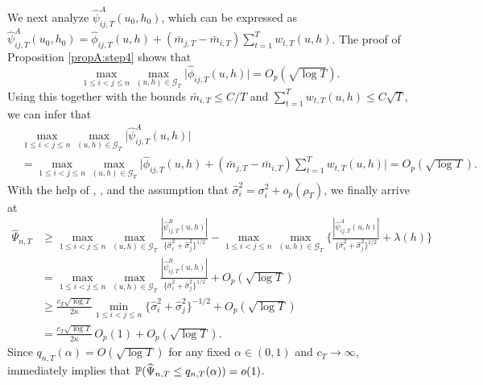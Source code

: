 \documentclass[12pt]{article}
\makeatletter
\renewcommand{\eqref}[1]{\tagform@{\ref{#1}}}
\makeatother
\begin{document}
We next analyze $\widehat{\psi}^A_{ij,T}(u_0,h_0)$, which can be expressed as $\widehat{\psi}^A_{ij,T}(u_0,h_0) = \widehat\phi_{ij,T}(u, h) + (\bar{m}_{j, T} - \bar{m}_{i, T}) \sum_{t=1}^T w_{t, T}(u, h)$. The proof of Proposition \ref{propA:step4} shows that 
\begin{equation*}
\max_{1 \le i < j \le n} \max_{(u,h) \in \mathcal{G}_T} \Big| \widehat{\phi}_{ij, T}(u,h) \Big| = O_p(\sqrt{\log T}). 
\end{equation*}
Using this together with the bounds $\bar{m}_{i, T} \le C/T$ and $\sum_{t=1}^T w_{t, T}(u, h) \le C \sqrt{T}$, we can infer that 
\begin{align} 
 & \max_{1 \le i < j \le n} \max_{(u,h) \in \mathcal{G}_T} \Big| \widehat\psi_{ij,T}^A(u, h) \Big| \nonumber \\[-0.2cm]
 & = \max_{1 \le i < j \le n} \max_{(u,h) \in \mathcal{G}_T} \Big| \widehat\phi_{ij,T}(u, h) + (\bar{m}_{j, T} - \bar{m}_{i, T}) \sum_{t=1}^T w_{t, T}(u, h) \Big| = O_p(\sqrt{\log T}). \label{eqA:power:psiA}
\end{align}
With the help of \eqref{eqA:power:psiB}, \eqref{eqA:power:psiA}, \eqref{eqA:power:lambda} and the assumption that $\widehat{\sigma}^2_i = \sigma^2_i + o_p(\rho_T)$, we finally arrive at 
\begin{align}
\widehat{\Psi}_{n, T}  
 & \ge \max_{1 \le i < j \le n} \max_{(u,h) \in \mathcal{G}_T} \frac{|\widehat{\psi}_{ij, T}^B(u,h)|}{\{\widehat{\sigma}_i^2 + \widehat{\sigma}_j^2\}^{1/2}} - \max_{1 \le i < j \le n} \max_{(u,h) \in \mathcal{G}_T} \bigg\{ \frac{|\widehat{\psi}_{ij, T}^A(u,h)|}{\{\widehat{\sigma}^2_i + \widehat{\sigma}_j^2\}^{1/2}} + \lambda(h) \bigg\} \nonumber \\
 & = \max_{1 \le i < j \le n} \max_{(u,h) \in \mathcal{G}_T} \frac{|\widehat{\psi}_{ij, T}^B(u,h)|}{\{\widehat{\sigma}_i^2 + \widehat{\sigma}_j^2\}^{1/2}} + O_p(\sqrt{\log T}) \nonumber \\
 & \ge \frac{c_T \sqrt{\log T}}{2 \kappa} \min_{1 \le i < j \le n}\{\widehat{\sigma}_i^2 + \widehat{\sigma}_j^2\}^{-1/2} + O_p(\sqrt{\log T}) \nonumber \\
 & = \frac{c_T \sqrt{\log T}}{2 \kappa} \, O_p(1) + O_p(\sqrt{\log T}). \label{eq5-proof-prop-test-power}
\end{align}
Since $q_{n, T}(\alpha) = O(\sqrt{\log T})$ for any fixed $\alpha \in (0,1)$ and $c_T \to \infty$, \eqref{eq5-proof-prop-test-power} immediately implies that $\mathbb{P}(\widehat{\Psi}_{n, T} \le q_{n, T}(\alpha)) = o(1)$. 
\end{document}
